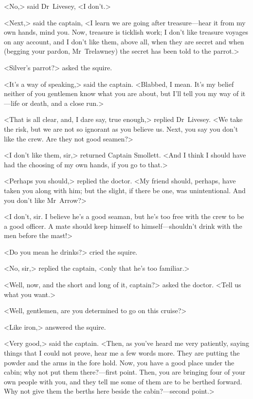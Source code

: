 <No,> said Dr~Livesey, <I don't.>

<Next,> said the captain, <I learn we are going after treasure—hear it from my own hands, mind you. Now, treasure is ticklish work; I don't like treasure voyages on any account, and I don't like them, above all, when they are secret and when (begging your pardon, Mr~Trelawney) the secret has been told to the parrot.>

<Silver's parrot?> asked the squire.

<It's a way of speaking,> said the captain. <Blabbed, I mean. It's my belief neither of you gentlemen know what you are about, but I'll tell you my way of it—life or death, and a close run.>

<That is all clear, and, I dare say, true enough,> replied Dr~Livesey. <We take the risk, but we are not so ignorant as you believe us. Next, you say you don't like the crew. Are they not good seamen?>

<I don't like them, sir,> returned Captain Smollett. <And I think I should have had the choosing of my own hands, if you go to that.>

<Perhaps you should,> replied the doctor. <My friend should, perhaps, have taken you along with him; but the slight, if there be one, was unintentional. And you don't like Mr~Arrow?>

<I don't, sir. I believe he's a good seaman, but he's too free with the crew to be a good officer. A mate should keep himself to himself—shouldn't drink with the men before the mast!>

<Do you mean he drinks?> cried the squire.

<No, sir,> replied the captain, <only that he's too familiar.>

<Well, now, and the short and long of it, captain?> asked the doctor. <Tell us what you want.>

<Well, gentlemen, are you determined to go on this cruise?>

<Like iron,> answered the squire.

<Very good,> said the captain. <Then, as you've heard me very patiently, saying things that I could not prove, hear me a few words more. They are putting the powder and the arms in the fore hold. Now, you have a good place under the cabin; why not put them there?—first point. Then, you are bringing four of your own people with you, and they tell me some of them are to be berthed forward. Why not give them the berths here beside the cabin?—second point.>


